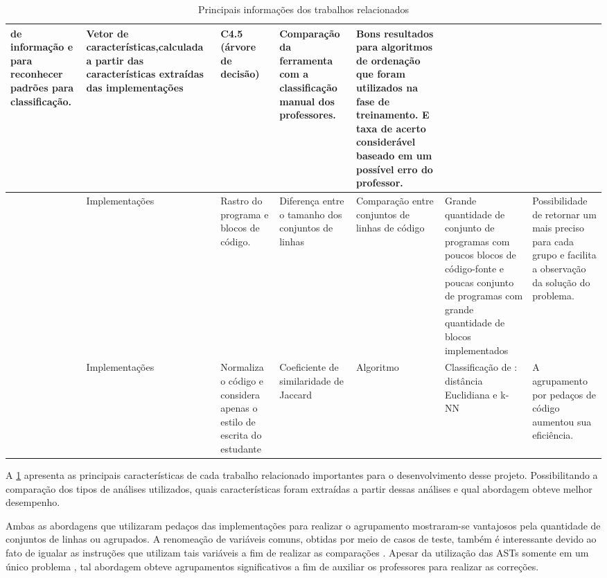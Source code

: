 \begin{table}[h]
\begin{tabularx}{\linewidth}{ |X|X|X|X|X|X|X| }
					de informação e para reconhecer padrões para classificação.
					& Vetor de características,calculada a partir das características extraídas
					das implementações
					& C4.5 (árvore de decisão)
					& Comparação da ferramenta com a classificação manual dos professores.
					& Bons resultados para algoritmos de ordenação que foram utilizados na
					fase de treinamento. E taxa de acerto considerável baseado em um possível
					erro do professor. \\
					\hline %
					\citeonline{Glassman:2015,glassman2016clustering,glassman2014interacting,glassman2013toward,glassman2013visualizing}
					& Implementações
					& Rastro do programa e blocos de código.
					& Diferença entre o tamanho dos conjuntos de linhas
					& Comparação entre conjuntos de linhas de código
					& Grande quantidade de conjunto de programas com poucos blocos de código-fonte e poucas
					conjunto de programas com grande quantidade de blocos implementados
					& Possibilidade de retornar um \foreign{feedback} mais preciso para cada
					grupo e facilita a observação da solução do problema. \\
					\hline %
					\citeonline{Wei2015}
					& Implementações
					& Normaliza o código e considera apenas o estilo de escrita do estudante
					& Coeficiente de similaridade de Jaccard
					& Algoritmo \foreign{Winnowing}
					& Classificação de \foreign{workload}: distância Euclidiana e \acs{k-NN}
					& A agrupamento por pedaços de código aumentou sua eficiência. \\
					\hline
				\end{tabularx}
				\caption{Principais informações dos trabalhos relacionados}
				\label{tab:caracPrinc}
			\end{table}
		
		A \cref{tab:caracPrinc} apresenta as principais características de cada trabalho
		relacionado importantes para o desenvolvimento desse projeto. Possibilitando a
		comparação dos tipos de análises utilizados, quais características foram
		extraídas a partir dessas análises e qual abordagem obteve melhor desempenho.
		
		Ambas as abordagens que utilizaram pedaços das implementações para realizar
		o agrupamento \cite{Glassman:2015,Wei2015} mostraram-se vantajosos pela
		quantidade de conjuntos de linhas ou  agrupados. A renomeação
		de variáveis comuns, obtidas por meio de casos de teste, também é interessante
		devido ao fato de igualar as instruções que utilizam tais variáveis a fim de
		realizar as comparações \cite{Glassman:2015}. Apesar da utilização das \acs{AST}s
		somente em um único problema \cite{Yin:2015}, tal abordagem obteve agrupamentos
		significativos a fim de auxiliar os professores para realizar as correções.
		
